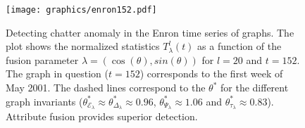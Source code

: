 \documentclass[10pt,draftclsnofoot,onecolumn]{IEEEtran}
\theoremstyle{definition}
\begin{document}
\begin{figure}[tbp]
  \centering
 \texttt{[image: graphics/enron152.pdf]} 
 \caption{Detecting chatter anomaly in the Enron time series of
   graphs. The plot shows the normalized statistics
   $T_{\lambda}^{l}(t)$ as a function of the fusion parameter $\lambda
   = (\cos(\theta), sin(\theta))$ for $l = 20$ and $t = 152$. The
   graph in question ($t = 152$) corresponds to the first week of May
   2001. The dashed lines correspond to the $\theta^{*}$ for the
   different graph invariants ($\theta^{*}_{\mathcal{E}_{\lambda}}
   \approx \theta^{*}_{\Delta_{\lambda}} \approx 0.96$,
   $\theta^{*}_{\Psi_{\lambda}} \approx 1.06$ and
   $\theta^{*}_{\tau_{\lambda}} \approx 0.83$). Attribute fusion
   provides superior detection.}
  \label{fig:enron}
\end{figure}
\end{document}
